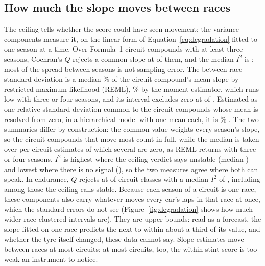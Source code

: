 \documentclass[11pt,a4paper]{article}
\begin{document}
\subsection{How much the slope moves between races}
\label{sec:variance}

The ceiling tells whether the score could have seen movement; the variance
components measure it, on the linear form of Equation~\ref{eq:degradation}
fitted to one season at a time. Over \VarN{} Formula~1 circuit-compounds with at least
three seasons, Cochran's $Q$ rejects a common slope at \VarHet{} of them, and the median
$I^2$ is \VarIsq{} \VarIsqCi{}: most of the spread between seasons is not
sampling error. The between-race standard deviation is a median
\TauPubShareReml{}\% \TauPubShareRemlCi{} of the circuit-compound's mean slope
by restricted maximum likelihood (REML), \VarTauShare{}\% by the moment
estimator, which runs low with three or four seasons, and its interval excludes
zero at \VarTauExcl{} of \VarN{}. Estimated as one relative standard deviation
common to the \TauPubCommonN{} circuit-compounds whose mean is resolved from
zero, in a hierarchical model with one mean each, it is \TauPubCommon{}\%
\TauPubCommonCi{}. The two summaries differ by construction: the common value
weights every season's slope, so the circuit-compounds that move most count in
full, while the median is taken over per-circuit estimates of which several are
zero, as REML returns with three or four seasons. $I^2$ is highest where the ceiling verdict says
unstable (median \VarIsqUnstable{}) and lowest where there is no signal
(\VarIsqNoSignal{}), so the two measures agree where both can speak. In
endurance, $Q$ rejects at \EndVarHet{} of \EndVarN{} circuit-classes with a
median $I^2$ of \EndVarIsq{}, including \EndVarIsqStable{} among those the
ceiling calls stable. Because each season of a circuit is one race, these
components also carry whatever moves every car's laps in that race at once,
which the standard errors do not see (Figure~\ref{fig:degradation} shows how much
wider race-clustered intervals are). They are upper bounds: read as a forecast,
the slope fitted on one race predicts the next to within about a third of its
value, and whether the tyre itself changed, these data cannot say. Slope
estimates move between races at most circuits; at most circuits, too, the
within-stint score is too weak an instrument to notice.
\end{document}
